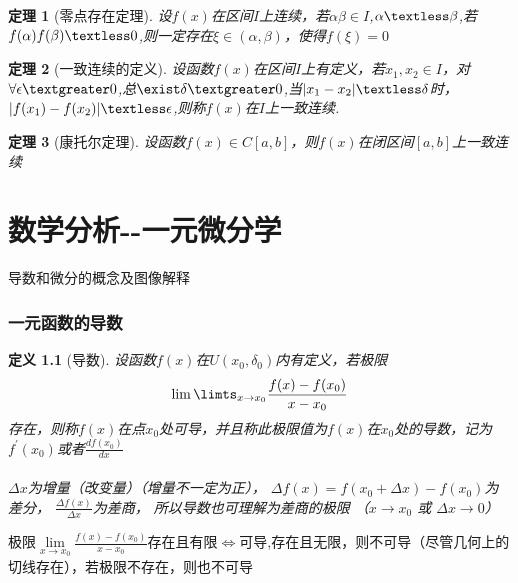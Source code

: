 \documentclass[12pt, a4paper, oneside]{ctexart}
\newtheorem{theorem}{定理}[section]
\newtheorem{definition}[theorem]{定义}
\begin{document}
\begin{theorem}[零点存在定理]
设$f(x)$在区间$I$上连续，若$\alpha \beta \in I$,$\alpha \textless \beta$,若$f(\alpha)f(\beta)\textless 0$,则一定存在$\xi \in (\alpha,\beta)$，使得$f(\xi)=0$
\end{theorem}

\begin{theorem}[一致连续的定义]
设函数$f(x)$在区间$I$上有定义，若$x_1,x_2 \in I$，对$\forall \epsilon \textgreater 0$,总$\exist \delta \textgreater 0$,当$|x_1-x_2| \textless \delta $时，$|f(x_1)-f(x_2)| \textless \epsilon$,则称$f(x)$在$I$上一致连续.
\end{theorem}

\begin{theorem}[康托尔定理]
设函数$f(x)\in C[a,b]$，则$f(x)$在闭区间$[a,b]$上一致连续
\end{theorem}

\chapter{数学分析-\uppercase\expandafter{}-一元微分学}

\begin{introduction}
  \item 导数和微分的概念及图像解释
\end{introduction}

\subsection{一元函数的导数}

\begin{definition}[导数]
设函数$f(x)$在$U(x_0,\delta_0)$内有定义，若极限
\begin{equation}
    \lim\limts_{x\to x_0}\frac{f(x)-f(x_0)}{x-x_0}
\end{equation}
存在，则称$f(x)$在点$x_0$处可导，并且称此极限值为$f(x)$在$x_0$处的导数，记为$f^{'}(x_0)$或者$\frac{df(x_0)}{dx}$\\ ~\\
$\Delta x$为增量（改变量）（增量不一定为正），
$\Delta f(x)=f(x_0+\Delta x)-f(x_0)$为差分，
$\frac{\Delta f(x)}{\Delta x}$为差商，
所以导数也可理解为差商的极限 （$x\to x_0$ \; 或\; $\Delta x\to 0$）
\end{definition}

\begin{remark}
极限$\lim\limits_{x\to x_0}\frac{f(x)-f(x_0)}{x-x_0}$存在且有限$\Leftrightarrow$可导,存在且无限，则不可导（尽管几何上的切线存在），若极限不存在，则也不可导
\end{remark}
\end{document}
